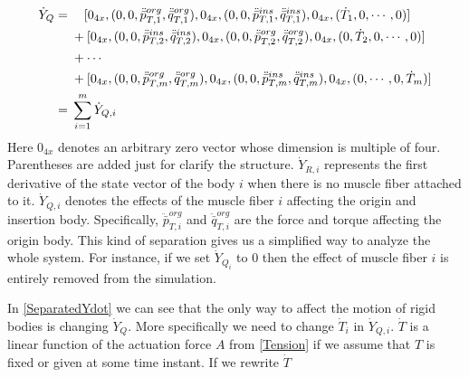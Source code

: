 \documentclass[a4paper,10pt]{article}
\begin{document}
\begin{align}
\dot{Y}_Q = {} & \quad[ 0_{4x}, (0, 0, \ddot{\bar{p}}_{T,1}^{org}, \ddot{\bar{q}}_{T,1}^{org}),
                   0_{4x}, (0, 0, \ddot{\bar{p}}_{T,1}^{ins}, \ddot{\bar{q}}_{T,1}^{ins}),
                   0_{4x}, (\dot{T}_1, 0, \cdots, 0)]\notag\\
               & + [ 0_{4x}, (0, 0, \ddot{\bar{p}}_{T,2}^{ins}, \ddot{\bar{q}}_{T,2}^{ins}),
                     0_{4x}, (0, 0, \ddot{\bar{p}}_{T,2}^{org}, \ddot{\bar{q}}_{T,2}^{org}),
                     0_{4x}, (0, \dot{T}_2, 0, \cdots, 0)]\notag\\
               & + \cdots\notag\\
               & + [ 0_{4x}, (0, 0, \ddot{\bar{p}}_{T,m}^{org}, \ddot{\bar{q}}_{T,m}^{org}),
                     0_{4x}, (0, 0, \ddot{\bar{p}}_{T,m}^{ins}, \ddot{\bar{q}}_{T,m}^{ins}),
                     0_{4x}, (0, \cdots, 0, \dot{T}_m)]\notag\\
          = {} & \sum_{i=1}^{m}{\dot{Y}_{Q,i}}
\end{align}
Here $0_{4x}$ denotes an arbitrary zero vector whose dimension is multiple of four.
Parentheses are added just for clarify the structure.
$\dot{Y}_{R,i}$ represents the first derivative of the state vector of the body $i$
when there is no muscle fiber attached to it. $\dot{Y}_{Q,i}$ denotes the effects of
the muscle fiber $i$ affecting the origin and insertion body. Specifically,
$ \ddot{\bar{p}}_{T,i}^{org} $ and $ \ddot{\bar{q}}_{T,i}^{org} $ are the force and
torque affecting the origin body. This kind of separation gives us a simplified
way to analyze the whole system. For instance, if we set $\dot{Y}_{Q_i}$ to 0 then
the effect of muscle fiber $i$ is entirely removed from the simulation.


In \eqref{SeparatedYdot} we can see that the only way to affect the motion
of rigid bodies is changing $\dot{Y}_Q$. More specifically we need to change
$\dot{T}_i$ in $\dot{Y}_{Q,i}$. $\dot{T}$ is a linear function of the actuation force $A$
from \eqref{Tension} if we assume that $T$ is fixed or given at some time instant.
If we rewrite $\dot{T}$
\end{document}
